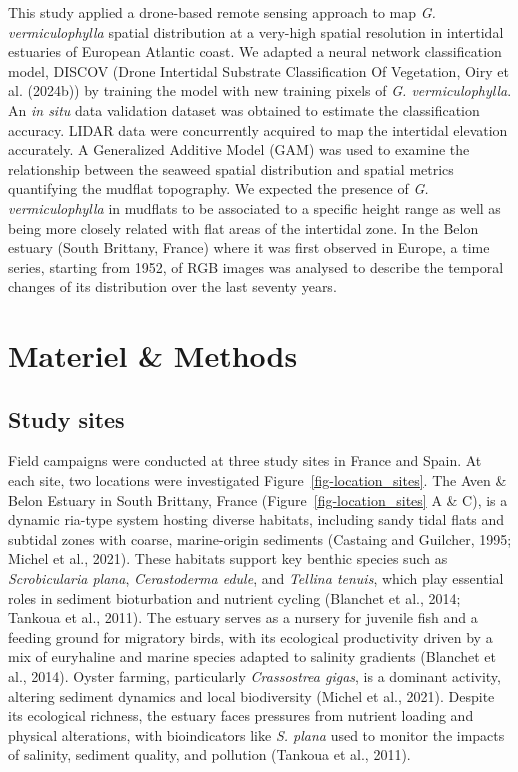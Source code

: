 \documentclass[
  letterpaper,
  DIV=11,
  numbers=noendperiod]{scrartcl}
\begin{document}
This study applied a drone-based remote sensing approach to map \emph{G.
vermiculophylla} spatial distribution at a very-high spatial resolution
in intertidal estuaries of European Atlantic coast. We adapted a neural
network classification model, DISCOV (Drone Intertidal Substrate
Classification Of Vegetation, Oiry et al. (2024b)) by training the model
with new training pixels of \emph{G. vermiculophylla}. An \emph{in situ}
data validation dataset was obtained to estimate the classification
accuracy. LIDAR data were concurrently acquired to map the intertidal
elevation accurately. A Generalized Additive Model (GAM) was used to
examine the relationship between the seaweed spatial distribution and
spatial metrics quantifying the mudflat topography. We expected the
presence of \emph{G. vermiculophylla} in mudflats to be associated to a
specific height range as well as being more closely related with flat
areas of the intertidal zone. In the Belon estuary (South Brittany,
France) where it was first observed in Europe, a time series, starting
from 1952, of RGB images was analysed to describe the temporal changes
of its distribution over the last seventy years.

\section{Materiel \& Methods}\label{materiel-methods}

\subsection{Study sites}\label{study-sites}

Field campaigns were conducted at three study sites in France and Spain.
At each site, two locations were investigated
Figure~\ref{fig-location_sites}. The Aven \& Belon Estuary in South
Brittany, France (Figure~\ref{fig-location_sites} A \& C), is a dynamic
ria-type system hosting diverse habitats, including sandy tidal flats
and subtidal zones with coarse, marine-origin sediments (Castaing and
Guilcher, 1995; Michel et al., 2021). These habitats support key benthic
species such as \emph{Scrobicularia plana}, \emph{Cerastoderma edule},
and \emph{Tellina tenuis}, which play essential roles in sediment
bioturbation and nutrient cycling (Blanchet et al., 2014; Tankoua et
al., 2011). The estuary serves as a nursery for juvenile fish and a
feeding ground for migratory birds, with its ecological productivity
driven by a mix of euryhaline and marine species adapted to salinity
gradients (Blanchet et al., 2014). Oyster farming, particularly
\emph{Crassostrea gigas}, is a dominant activity, altering sediment
dynamics and local biodiversity (Michel et al., 2021). Despite its
ecological richness, the estuary faces pressures from nutrient loading
and physical alterations, with bioindicators like \emph{S. plana} used
to monitor the impacts of salinity, sediment quality, and pollution
(Tankoua et al., 2011).
\end{document}
